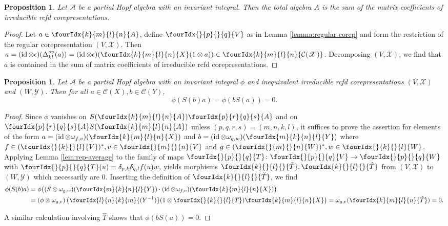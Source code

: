 \documentclass[10pt]{article}
\DeclareMathOperator{\id}{id}
\DeclareMathOperator{\op}{\mathrm{op}}
\newcommand{\dual}[1]{#1^{*}}
\newcommand{\Gr}[5]{\fourIdx{#2}{#4}{#3}{#5}{#1}}%
\newcommand{\Gru}[3]{\Gr{#1}{}{}{#2}{#3}}
\newcommand{\Grd}[3]{\Gr{#1}{#2}{#3}{}{}}
\newtheorem{Prop}[Theorem]{Proposition}
\theoremstyle{definition}
\numberwithin{equation}{section}
\begin{document}
\begin{Prop} \label{prop:rep-weak-pw} Let $\mathscr{A}$ be a partial
  Hopf algebra with an invariant integral. Then the total algebra $A$ is the sum
  of the matrix coefficients of irreducible rcfd corepresentations.
\end{Prop}
\begin{proof} 
  Let $a \in \Gr{A}{k}{l}{m}{n}$, define $\Gru{V}{p}{q}$ as in
  Lemma \ref{lemma:regular-corep} and form the restriction of the regular
  corepresentation $(V,\mathscr{X})$. Then
  $a = (\id \otimes \epsilon)(\Delta^{\op}_{kl}(a)) =
    (\id \otimes \epsilon)(\Gr{X}{k}{l}{m}{n}(1 \otimes a)) \in
    \Gr{\mathcal{C}(\mathscr{X})}{k}{l}{m}{n}$.
  Decomposing $(V,\mathscr{X})$, we find that
  $a$ is contained in the sum of matrix coefficients of irreducible
rcfd  corepresentations.
\end{proof}


\begin{Prop} \label{prop:rep-orthogonality-1} Let $\mathcal{A}$ be a
  partial Hopf algebra with an invariant integral $\phi$ and inequivalent
  irreducible rcfd corepresentations $(V,\mathscr{X})$ and
  $(W,\mathscr{Y})$.  Then  for all
  $a\in \mathcal{C}(X), b \in \mathcal{C}(Y)$,
  \[\phi(S(b)a) = \phi(bS(a))=0.\]
\end{Prop}
\begin{proof}
Since $\phi$ vanishes on $S(\Gr{A}{k}{l}{m}{n})\Gr{A}{p}{q}{r}{s}$ and
on $\Gr{A}{p}{q}{r}{s}S(\Gr{A}{k}{l}{m}{n})$ unless
$(p,q,r,s) = (m,n,k,l)$, it suffices to prove the assertion for  elements of the form $
  a=(\id \otimes \omega_{f,v})(\Gr{X}{k}{l}{m}{n})$ and  $b =(\id \otimes \omega_{g,w})(\Gr{Y}{m}{n}{k}{l})$
where $f\in \dual{(\Gru{V}{k}{l})}, v \in \Gru{V}{m}{n}$ and $g \in
\dual{(\Gru{W}{m}{n})}, w \in \Gru{W}{k}{l}$.  Applying Lemma
\ref{lem:rep-average} to the family of maps $\Gru{T}{p}{q} \colon \Gru{V}{p}{q} \to \Gru{W}{p}{q}$ with $\Gru{T}{p}{q}(u) =  \delta_{p,k}\delta_{q,l}  f(u)w,$
  yields morphisms $\Grd{\check{T}}{k}{l},\Grd{\hat{T}}{k}{l}$ from $(V,\mathscr{X})$ to
  $(W,\mathscr{Y})$ which necessarily are $0$. Inserting the
  definition of $\Grd{\check{T}}{k}{l}$, we find
  \begin{align*}
    \phi(S(b)a) &= \phi\big((S \otimes
    \omega_{g,w})(\Gr{Y}{m}{n}{k}{l}) \cdot (\id \otimes
    \omega_{f,v})(\Gr{X}{k}{l}{m}{n})\big) \\ &= (\phi \otimes \omega_{g,v})\left(\Gr{(Y^{-1})}{l}{k}{n}{m}(1 \otimes
      \Gru{T}{k}{l} )     \Gr{X}{k}{l}{m}{n}\right) 
    = \omega_{g,v}( \Gr{\check{T}}{k}{l}{m}{n}) = 0.
  \end{align*}
  
  A similar calculation involving $\hat{T}$ shows that
  $\phi(bS(a))=0$.  
\end{proof}
\end{document}
